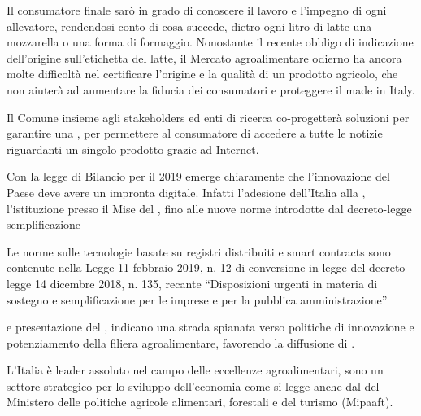 \documentclass[a4paper,14pt,italian]{sphinxmanual}
\begin{document}
Il consumatore finale sarò in grado di conoscere il lavoro e l’impegno di ogni allevatore, rendendosi conto di cosa succede, dietro ogni litro di latte una mozzarella o una forma di formaggio.
Nonostante il recente obbligo di indicazione dell’origine sull’etichetta del latte, il Mercato agroalimentare odierno ha ancora molte difficoltà nel certificare l’origine e la qualità di un prodotto agricolo, che non aiuterà ad aumentare la fiducia dei consumatori e proteggere il made in Italy.

Il Comune insieme agli stakeholders ed enti di ricerca co-progetterà soluzioni per garantire una ,​ per permettere al consumatore di accedere a tutte le notizie riguardanti un singolo prodotto grazie ad Internet.

Con la legge di Bilancio per il 2019 emerge chiaramente che l’innovazione del Paese deve avere un impronta digitale.
Infatti l’adesione dell’Italia alla  , l’istituzione presso il Mise del , fino alle nuove norme introdotte dal decreto-legge semplificazione %
\begin{footnote}[2]\sphinxAtStartFootnote
Le norme sulle tecnologie basate su registri distribuiti e smart contracts sono contenute nella Legge 11 febbraio 2019, n. 12 di conversione in legge del decreto-legge 14 dicembre 2018, n. 135, recante “Disposizioni urgenti in materia di sostegno e semplificazione per le imprese e per la pubblica amministrazione”
%
\end{footnote} e presentazione del , indicano una strada spianata verso politiche di innovazione e potenziamento della filiera agroalimentare, favorendo la diffusione di .

L’Italia è leader assoluto nel campo delle eccellenze agroalimentari, sono un settore strategico per lo sviluppo dell’economia come si legge anche dal  del Ministero delle politiche agricole alimentari, forestali e del turismo (Mipaaft).
\end{document}
